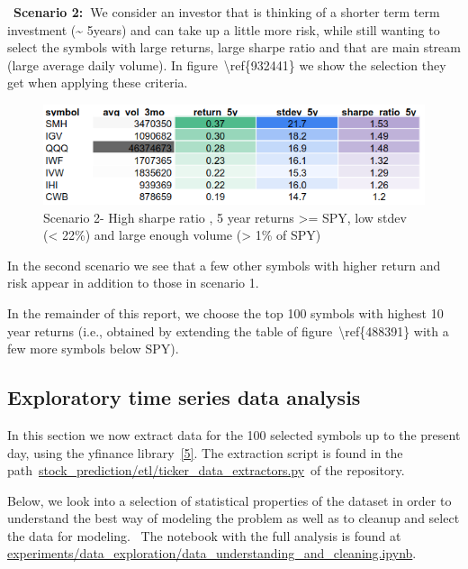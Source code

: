 \documentclass[10pt]{article}
\begin{document}
~\textbf{Scenario 2:~}We consider an investor that is thinking of a
shorter term term investment (\textasciitilde{} 5years) and can take up
a little more risk, while still wanting to select the symbols with large
returns, large sharpe ratio and that are main stream (large average
daily volume). In figure~{\textbackslash ref\{932441\}} we show the
selection they get when applying these criteria.
\begin{figure}[H]
\begin{center}
\includegraphics[width=0.70\columnwidth]{figures/screenshot2/screenshot2}
\caption{{Scenario 2- High sharpe ratio , 5 year returns \textgreater{}= SPY, low
stdev (\textless{} 22\%) and large enough volume (\textgreater{} 1\% of
SPY)
{\label{932441}}%
}}
\end{center}
\end{figure}

In the second scenario we see that a few other symbols with higher
return and risk appear in addition to those in scenario 1.

In the remainder of this report, we choose the top 100 symbols with
highest 10 year returns (i.e., obtained by extending the table of
figure~{\textbackslash ref\{488391\}} with a few more symbols below
SPY).~~

\hypertarget{exploratory-time-series-data-analysis}{%
\subsection{Exploratory time series data
analysis}\label{exploratory-time-series-data-analysis}}

In this section we now extract data for the 100 selected symbols up to
the present day, using the yfinance library~\hyperref[csl:5]{[5]}. The
extraction script is found in the
path~\href{https://github.com/marcoopsampaio/aws_ml_eng_project_stock_prediction/blob/main/stock_prediction/etl/ticker_data_extractors.py}{stock\_prediction/etl/ticker\_data\_extractors.py}~of
the repository.

Below, we look into a selection of statistical properties of the dataset
in order to understand the best way of modeling the problem as well as
to cleanup and select the data for modeling.~ The notebook with the full
analysis is found at
\href{https://github.com/marcoopsampaio/aws_ml_eng_project_stock_prediction/blob/main/experiments/data_exploration/data_understanding_and_cleaning.ipynb}{experiments/data\_exploration/data\_understanding\_and\_cleaning.ipynb}.
\end{document}
